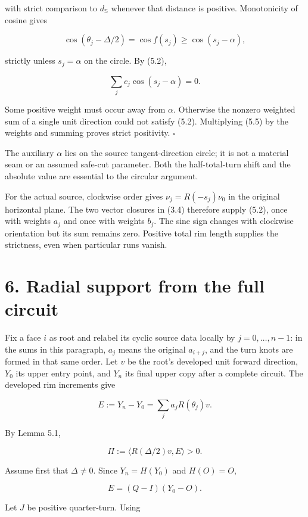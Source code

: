 \documentclass[
  11pt,
  letterpaper,
]{article}
\begin{document}
with strict comparison to \(d_{\mathbb S}\) whenever that distance is
positive. Monotonicity of cosine gives

\[
\cos(\theta_j-\Delta/2)
=\cos f(s_j)
\ge\cos(s_j-\alpha),
\tag{5.5}
\]

strictly unless \(s_j=\alpha\) on the circle. By (5.2),

\[
\sum_jc_j\cos(s_j-\alpha)=0.
\]

Some positive weight must occur away from \(\alpha\). Otherwise the
nonzero weighted sum of a single unit direction could not satisfy (5.2).
Multiplying (5.5) by the weights and summing proves strict positivity.
\(\square\)

The auxiliary \(\alpha\) lies on the source tangent-direction circle; it
is not a material seam or an assumed safe-cut parameter. Both the
half-total-turn shift and the absolute value are essential to the
circular argument.

For the actual source, clockwise order gives \(\nu_j=R(-s_j)\nu_0\) in
the original horizontal plane. The two vector closures in (3.4)
therefore supply (5.2), once with weights \(a_j\) and once with weights
\(b_j\). The sine sign changes with clockwise orientation but its sum
remains zero. Positive total rim length supplies the strictness, even
when particular runs vanish.

\section{6. Radial support from the full
circuit}\label{radial-support-from-the-full-circuit}

Fix a face \(i\) as root and relabel its cyclic source data locally by
\(j=0,\ldots,n-1\): in the sums in this paragraph, \(a_j\) means the
original \(a_{i+j}\), and the turn knots are formed in that same order.
Let \(v\) be the root's developed unit forward direction, \(Y_0\) its
upper entry point, and \(Y_n\) its final upper copy after a complete
circuit. The developed rim increments give

\[
E:=Y_n-Y_0=\sum_j a_j R(\theta_j)v.
\]

By Lemma 5.1,

\[
\Pi:=\langle R(\Delta/2)v,E\rangle>0.
\tag{6.1}
\]

Assume first that \(\Delta\ne0\). Since \(Y_n=H(Y_0)\) and \(H(O)=O\),

\[
E=(Q-I)(Y_0-O).
\]

Let \(J\) be positive quarter-turn. Using
\end{document}
